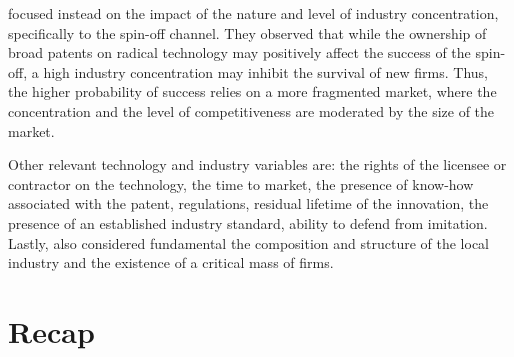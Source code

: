 \citet{Nerkar2003} focused instead on the impact of the nature and level of industry concentration, specifically to the spin-off channel. They observed that while the ownership of broad patents on radical technology may positively affect the success of the spin-off, a high industry concentration may inhibit the survival of new firms. Thus, the higher probability of success relies on a more fragmented market, where the concentration and the level of competitiveness are moderated by the size of the market. 

Other relevant technology and industry variables are: the rights of the licensee or contractor on the technology, the time to market, the presence of know-how associated with the patent, regulations, residual lifetime of the innovation, the presence of an established industry standard, ability to defend from imitation\citep{Balderi2010}. Lastly, \citet{Geuna2009} also considered fundamental the composition and structure of the local industry and the existence of a critical mass of firms.

\section{Recap}
